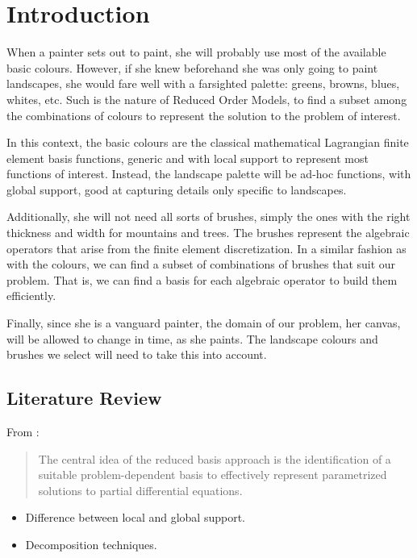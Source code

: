 \documentclass[thesis.tex]{subfiles}
\begin{document}
\section{Introduction}
When a painter sets out to paint, she will probably use most of the available basic colours.
However, if she knew beforehand she was only going to paint landscapes, 
she would fare well with a farsighted palette: greens, browns, blues, whites, etc.
Such is the nature of Reduced Order Models, 
to find a subset among the combinations of colours to represent the solution to the problem of interest.

In this context, the basic colours are the classical mathematical Lagrangian finite element basis functions, 
generic and with local support to represent most functions of interest.
Instead, the landscape palette will be ad-hoc functions, with global support, good at capturing details only specific to landscapes.

Additionally, she will not need all sorts of brushes, simply the ones with the right thickness and width for mountains and trees.
The brushes represent the algebraic operators that arise from the finite element discretization.
In a similar fashion as with the colours, we can find a subset of combinations of brushes that suit our problem.
That is, we can find a basis for each algebraic operator to build them efficiently.

Finally, since she is a vanguard painter, the domain of our problem, her canvas, will be allowed to change in time, as she paints.
The landscape colours and brushes we select will need to take this into account.

\subsection{Literature Review}

From  \cite{2016_CertifiedReducedBasisMethodsParametrizedPDE_Hesthaven}:
\begin{quotation}
    The central idea of the reduced basis approach is the identification of a suitable problem-dependent basis to effectively represent parametrized solutions to partial differential equations.
\end{quotation}

\begin{itemize}
    \item Difference between local and global support.
    \item Decomposition techniques.
\end{itemize}
\end{document}
